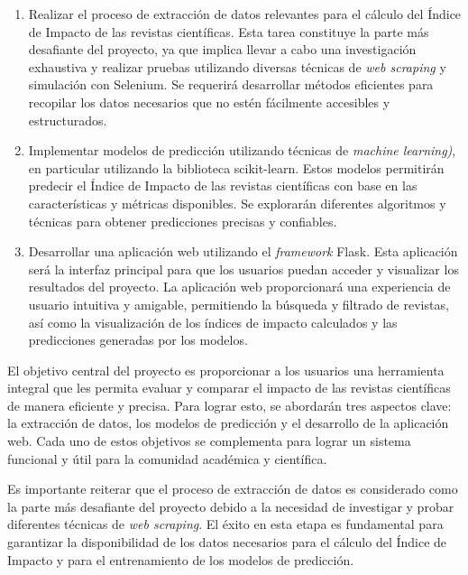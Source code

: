 \begin{enumerate}
    \item Realizar el proceso de extracción de datos relevantes para el cálculo del Índice de Impacto de las revistas científicas. Esta tarea constituye la parte más desafiante del proyecto, ya que implica llevar a cabo una investigación exhaustiva y realizar pruebas utilizando diversas técnicas de \textit{web scraping} y simulación con Selenium. Se requerirá desarrollar métodos eficientes para recopilar los datos necesarios que no estén fácilmente accesibles y estructurados.
    
    \item Implementar modelos de predicción utilizando técnicas de \textit{machine learning)}, en particular utilizando la biblioteca scikit-learn. Estos modelos permitirán predecir el Índice de Impacto de las revistas científicas con base en las características y métricas disponibles. Se explorarán diferentes algoritmos y técnicas para obtener predicciones precisas y confiables.
    
    \item Desarrollar una aplicación web utilizando el \textit{framework} Flask. Esta aplicación será la interfaz principal para que los usuarios puedan acceder y visualizar los resultados del proyecto. La aplicación web proporcionará una experiencia de usuario intuitiva y amigable, permitiendo la búsqueda y filtrado de revistas, así como la visualización de los índices de impacto calculados y las predicciones generadas por los modelos.
\end{enumerate}

El objetivo central del proyecto es proporcionar a los usuarios una herramienta integral que les permita evaluar y comparar el impacto de las revistas científicas de manera eficiente y precisa. Para lograr esto, se abordarán tres aspectos clave: la extracción de datos, los modelos de predicción y el desarrollo de la aplicación web. Cada uno de estos objetivos se complementa para lograr un sistema funcional y útil para la comunidad académica y científica.

Es importante reiterar que el proceso de extracción de datos es considerado como la parte más desafiante del proyecto debido a la necesidad de investigar y probar diferentes técnicas de \textit{web scraping}. El éxito en esta etapa es fundamental para garantizar la disponibilidad de los datos necesarios para el cálculo del Índice de Impacto y para el entrenamiento de los modelos de predicción.


